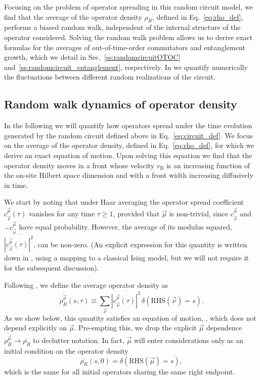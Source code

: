 \documentclass[aps,prb,twocolumn,superscriptaddress]{revtex4-1}
\begin{document}
Focusing on the problem of operator spreading in this random circuit model, we find that the average of the operator density $\rho_R$, defined in Eq.~\eqref{eq:rho_def}, performs a biased random walk, independent of the internal structure of the operator considered. Solving the random walk problem allows us to derive exact formulas for the averages of out-of-time-order commutators and entanglement growth, which we detail in Sec.~\ref{ss:randomcircuitOTOC} and~\ref{ss:randomcircuit_entanglement}, respectively. In  we quantify numerically the fluctuations between different random realizations of the circuit.

\subsection{Random walk dynamics of operator density}\label{ss:randomwalkdynamics}

In the following we will quantify how operators spread under the time evolution generated by the random circuit defined above in Eq.~\eqref{eq:circuit_def}. We focus on the average of the operator density, defined in Eq.~\eqref{eq:rho_def}, for which we derive an exact equation of motion. Upon solving this equation we find that the operator density moves in a front whose velocity $v_{\text{B}}$ is an increasing function of the on-site Hilbert space dimension and with a front width increasing diffusively in time. 

We start by noting that under Haar averaging the operator spread coefficient $c_{\vec{\nu}}^{\vec{\mu}}(\tau)$ vanishes for any time $\tau\geq1$, provided that $\vec{\mu}$ is non-trivial, since $c_{\vec{\nu}}^{\vec{\mu}}$ and $-c_{\vec{\nu}}^{\vec{\mu}}$ have equal probability. However, the average of its modulus squared, $\overline{|c_{\vec{\nu}}^{\vec{\mu}}(\tau)|^{2}}$, can be non-zero. (An explicit expression for this quantity is written down in , using a mapping to a classical Ising model, but we will not require it for the subsequent discussion).

Following , we define the average operator density as
\begin{equation}
\overline{\rho_R^{\vec{\mu}}}(s,\tau) \equiv \sum_{\vec{\nu}} \overline{|c_{\vec{\nu}}^{\vec{\mu}}(\tau)|^{2}}\,\delta(\text{RHS}(\vec{\nu}) = s).
\end{equation}
As we show below, this quantity satisfies an equation of motion, , which does not depend explicitly on $\vec{\mu}$. Pre-empting this, we drop the explicit $\vec{\mu}$ dependence $\overline{\rho_R^{\vec{\mu}}}\rightarrow \overline{\rho_R}$ to declutter notation. In fact, $\vec{\mu}$ will enter considerations only as an initial condition on the operator density
\begin{equation}\label{eq:rho_initial}
\overline{\rho_R}(s,0) = \delta(\text{RHS}(\vec{\mu}) = s),
\end{equation}
which is the same for all initial operators sharing the same right endpoint.
\end{document}
